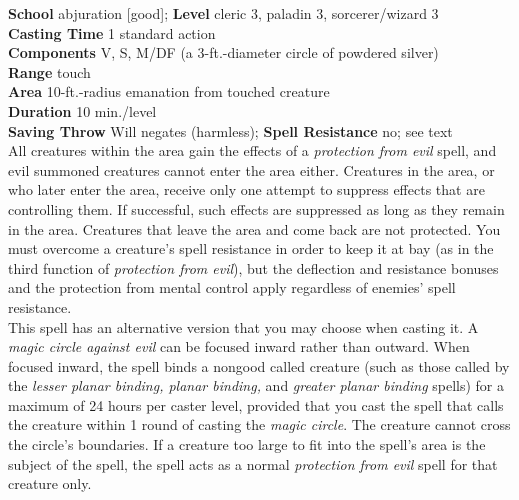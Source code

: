 \textbf{School} abjuration [good]; \textbf{Level} cleric 3, paladin 3, sorcerer/wizard 3\\
\textbf{Casting Time} 1 standard action\\
\textbf{Components} V, S, M/DF (a 3-ft.-diameter circle of powdered silver)\\
\textbf{Range} touch\\
\textbf{Area} 10-ft.-radius emanation from touched creature\\
\textbf{Duration} 10 min./level\\
\textbf{Saving Throw }Will negates (harmless); \textbf{Spell Resistance} no; see text\\
All creatures within the area gain the effects of a \textit{protection from evil }spell, and evil summoned creatures cannot enter the area either. Creatures in the area, or who later enter the area, receive only one attempt to suppress effects that are controlling them. If successful, such effects are suppressed as long as they remain in the area. Creatures that leave the area and come back are not protected. You must overcome a creature's spell resistance in order to keep it at bay (as in the third function of \textit{protection from evil}), but the deflection and resistance bonuses and the protection from mental control apply regardless of enemies' spell resistance.\\
This spell has an alternative version that you may choose when casting it. A \textit{magic circle against evil }can be focused inward rather than outward. When focused inward, the spell binds a nongood called creature (such as those called by the \textit{lesser planar binding, planar binding, }and \textit{greater planar binding }spells) for a maximum of 24 hours per caster level, provided that you cast the spell that calls the creature within 1 round of casting the \textit{magic circle}. The creature cannot cross the circle's boundaries. If a creature too large to fit into the spell's area is the subject of the spell, the spell acts as a normal \textit{protection from evil }spell for that creature only.\\
